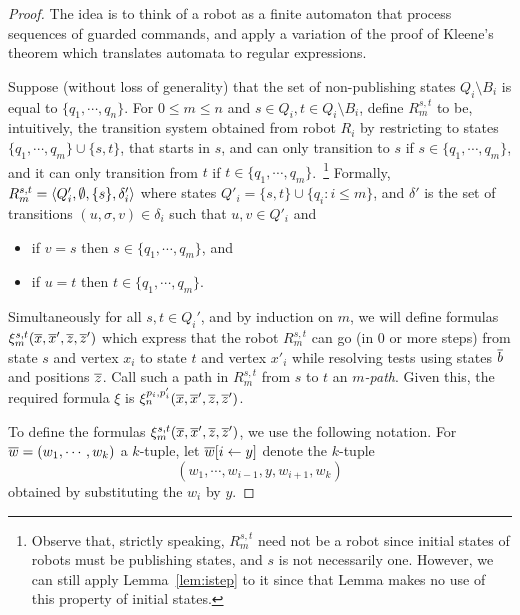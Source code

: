 \begin{proof}
The idea is to think of a robot as a finite automaton that process sequences of guarded commands, and apply a variation of the proof of Kleene's theorem which translates 
automata to regular expressions. 



Suppose (without loss of generality) that the set of non-publishing states $Q_i \setminus B_i$ is equal to $\{q_1, \cdots, q_n\}$.
For $0 \leq m \leq n$ and $s \in Q_i, t \in Q_i \setminus B_i$, define $R_m^{s,t}$ to be, intuitively, the transition system obtained from robot $R_i$ by restricting 
to states $\{q_1, \cdots, q_m\} \cup \{s,t\}$, that starts in $s$, and can only transition to 
$s$ if $s \in \{q_1, \cdots, q_m\}$, and it can only transition from $t$ if $t \in \{q_1, \cdots, q_m\}$.~\footnote{Observe that, strictly speaking, $R_m^{s,t}$ need not be a robot since initial states of robots must be publishing states, and $s$ is not necessarily one. However, we can still apply Lemma~\ref{lem:istep} to it since that Lemma makes no use of this property of initial states.} Formally, $R_m^{s,t} = \langle {Q'_i,\emptyset,\{s\},\delta'_i} \rangle$ 
where states $Q'_i = \{s,t\} \cup \{q_i : i \leq m\}$, and $\delta'$ is the set of transitions $(u,\sigma,v) \in \delta_i$ such that $u,v \in Q'_i$ and
\begin{itemize} 
 \item if $v = s$ then $s \in \{q_1, \cdots, q_m\}$, and
 \item if $u = t$ then $t \in \{q_1, \cdots, q_m\}$.
\end{itemize}

Simultaneously for all $s,t \in Q_i'$, and by induction on $m$, we will define formulas $\xi_m^{s,t}(\overline{x},\overline{x}',\overline{z},\overline{z}')$ %
which express that the robot $R_m^{s,t}$ can go (in $0$ or more steps) from state $s$ and vertex $x_i$ to state $t$ and vertex $x'_i$ while resolving tests using states $\overline{b}$ and positions $\overline{z}$. 
Call such a path in $R_m^{s,t}$ from $s$ to $t$ an \emph{$m$-path}. 
Given this, the required formula $\xi$ is $\xi_n^{p_i,p'_i}(\overline{x},\overline{x}',\overline{z},\overline{z}')$.

To define the formulas $\xi_m^{s,t}(\overline{x},\overline{x}',\overline{z},\overline{z}')$, 
we use the following notation. For $\overline{w} = (w_1, \cdots, w_k)$ a $k$-tuple, 
let $\overline{w}[i \leftarrow y]$ denote the $k$-tuple 
\[ (w_1, \cdots, w_{i-1}, y, w_{i+1}, w_k)
\]
 obtained 
by substituting the $w_i$ by $y$.


\end{proof}
